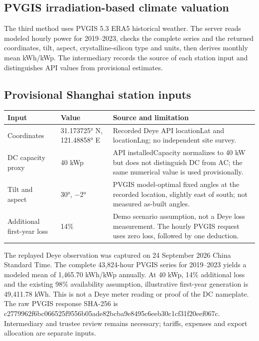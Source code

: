 \documentclass[12pt,a4paper]{article}
\begin{document}
\clearpage
\subsection{PVGIS irradiation-based climate valuation}
The third method uses PVGIS 5.3 ERA5 historical weather. The server reads modeled hourly power for 2019–2023, checks the complete series and the returned coordinates, tilt, aspect, crystalline-silicon type and units, then derives monthly mean kWh/kWp. The intermediary records the source of each station input and distinguishes API values from provisional estimates.

\subsection{Provisional Shanghai station inputs}
\begin{longtable}{L{3.5cm}L{3.2cm}L{8cm}}\toprule Input & Value & Source and limitation\\\midrule
Coordinates & 31.173725° N, 121.48858° E & Recorded Deye API locationLat and locationLng; no independent site survey.\\\midrule
DC capacity proxy & 40 kWp & API installedCapacity normalizes to 40 kW but does not distinguish DC from AC; the same numerical value is used provisionally.\\\midrule
Tilt and aspect & 30°, −2° & PVGIS model-optimal fixed angles at the recorded location, slightly east of south; not measured as-built angles.\\\midrule
Additional first-year loss & 14\% & Demo scenario assumption, not a Deye loss measurement. The hourly PVGIS request uses zero loss, followed by one deduction.\\\bottomrule\end{longtable}
The replayed Deye observation was captured on 24 September 2026 China Standard Time. The complete 43,824-hour PVGIS series for 2019–2023 yields a modeled mean of 1,465.70 kWh/kWp annually. At 40 kWp, 14\% additional loss and the existing 98\% availability assumption, illustrative first-year generation is 49,411.78 kWh. This is not a Deye meter reading or proof of the DC nameplate. The raw PVGIS response SHA-256 is c2779962f6bc066525f9556b05ade82bcba9e8495c6eeb30c1cf31f20eef067c. Intermediary and trustee review remains necessary; tariffs, expenses and export allocation are separate inputs.
\end{document}

